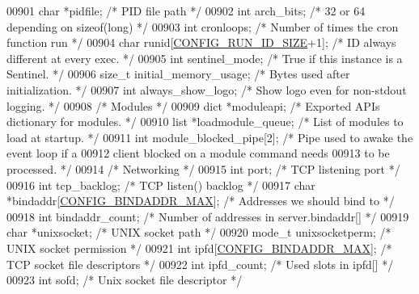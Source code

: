 \begin{DoxyCode}
{{{{{{00901     \textcolor{keywordtype}{char} *pidfile;              \textcolor{comment}{/* PID file path */}
00902     \textcolor{keywordtype}{int} arch\_bits;              \textcolor{comment}{/* 32 or 64 depending on sizeof(long) */}
00903     \textcolor{keywordtype}{int} cronloops;              \textcolor{comment}{/* Number of times the cron function run */}
00904     \textcolor{keywordtype}{char} runid[\hyperlink{server_8h_aba6794fa3ee28f85165eaed93190f1df}{CONFIG\_RUN\_ID\_SIZE}+1];  \textcolor{comment}{/* ID always different at every exec. */}
00905     \textcolor{keywordtype}{int} sentinel\_mode;          \textcolor{comment}{/* True if this instance is a Sentinel. */}
00906     size\_t initial\_memory\_usage; \textcolor{comment}{/* Bytes used after initialization. */}
00907     \textcolor{keywordtype}{int} always\_show\_logo;       \textcolor{comment}{/* Show logo even for non-stdout logging. */}
00908     \textcolor{comment}{/* Modules */}
00909     dict *moduleapi;            \textcolor{comment}{/* Exported APIs dictionary for modules. */}
00910     list *loadmodule\_queue;     \textcolor{comment}{/* List of modules to load at startup. */}
00911     \textcolor{keywordtype}{int} module\_blocked\_pipe[2]; \textcolor{comment}{/* Pipe used to awake the event loop if a}
00912 \textcolor{comment}{                                   client blocked on a module command needs}
00913 \textcolor{comment}{                                   to be processed. */}
00914     \textcolor{comment}{/* Networking */}
00915     \textcolor{keywordtype}{int} port;                   \textcolor{comment}{/* TCP listening port */}
00916     \textcolor{keywordtype}{int} tcp\_backlog;            \textcolor{comment}{/* TCP listen() backlog */}
00917     \textcolor{keywordtype}{char} *bindaddr[\hyperlink{server_8h_a314d02fcabccac3e59ecaa9d34f0d597}{CONFIG\_BINDADDR\_MAX}]; \textcolor{comment}{/* Addresses we should bind to */}
00918     \textcolor{keywordtype}{int} bindaddr\_count;         \textcolor{comment}{/* Number of addresses in server.bindaddr[] */}
00919     \textcolor{keywordtype}{char} *unixsocket;           \textcolor{comment}{/* UNIX socket path */}
00920     mode\_t unixsocketperm;      \textcolor{comment}{/* UNIX socket permission */}
00921     \textcolor{keywordtype}{int} ipfd[\hyperlink{server_8h_a314d02fcabccac3e59ecaa9d34f0d597}{CONFIG\_BINDADDR\_MAX}]; \textcolor{comment}{/* TCP socket file descriptors */}
00922     \textcolor{keywordtype}{int} ipfd\_count;             \textcolor{comment}{/* Used slots in ipfd[] */}
00923     \textcolor{keywordtype}{int} sofd;                   \textcolor{comment}{/* Unix socket file descriptor */}
}}}}}}
\end{DoxyCode}
